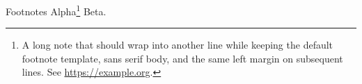 \documentclass[aspectratio=169]{beamer}
\begin{document}
\begin{frame}{Footnotes}
Alpha\footnote{A long note that should wrap into another line while keeping the default footnote template, sans serif body, and the same left margin on subsequent lines. See \url{https://example.org}.} Beta.
\end{frame}
\end{document}
